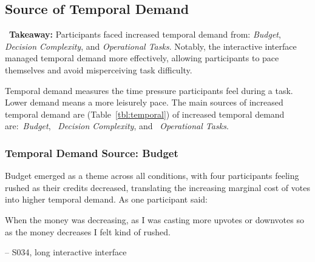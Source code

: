 \subsection{Source of Temporal Demand} 
\label{sec:temporal}
\vspace{5pt}

\begin{tldrbox}
    \faInfoCircle~\xspace\textbf{Takeaway:} Participants faced increased temporal demand from: \textit{Budget}, \textit{Decision Complexity}, and \textit{Operational Tasks}. Notably, the interactive interface managed temporal demand more effectively, allowing participants to pace themselves and avoid misperceiving task difficulty.
\end{tldrbox}

Temporal demand measures the time pressure participants feel during a task. Lower demand means a more leisurely pace. The main sources of increased temporal demand are (Table~\ref{tbl:temporal}) of increased temporal demand are:~\textit{Budget}, ~\textit{Decision Complexity}, and ~\textit{Operational Tasks}. 

\subsubsection{Temporal Demand Source: Budget}
Budget emerged as a theme across all conditions, with four participants feeling rushed as their credits decreased, translating the increasing marginal cost of votes into higher temporal demand. As one participant said:

\begin{displayquote}
When the money was decreasing, as I was casting more upvotes or downvotes so as the money decreases I felt kind of rushed.
            
\noindent \hfill -- S034, long interactive interface
\end{displayquote}


